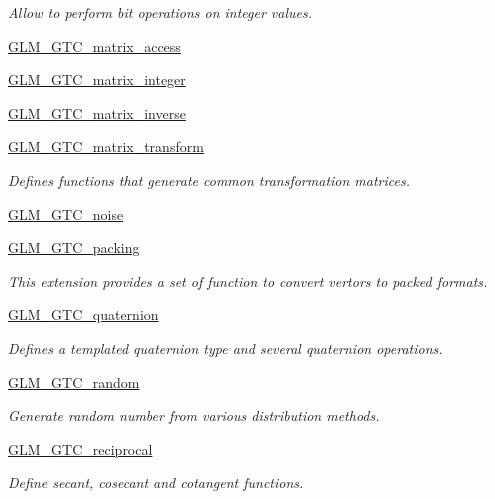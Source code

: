 \begin{DoxyCompactItemize}
\begin{DoxyCompactList}\small\item\em Allow to perform bit operations on integer values. \end{DoxyCompactList}\item 
\hyperlink{group__gtc__matrix__access}{G\+L\+M\+\_\+\+G\+T\+C\+\_\+matrix\+\_\+access}
\item 
\hyperlink{group__gtc__matrix__integer}{G\+L\+M\+\_\+\+G\+T\+C\+\_\+matrix\+\_\+integer}
\item 
\hyperlink{group__gtc__matrix__inverse}{G\+L\+M\+\_\+\+G\+T\+C\+\_\+matrix\+\_\+inverse}
\item 
\hyperlink{group__gtc__matrix__transform}{G\+L\+M\+\_\+\+G\+T\+C\+\_\+matrix\+\_\+transform}
\begin{DoxyCompactList}\small\item\em Defines functions that generate common transformation matrices. \end{DoxyCompactList}\item 
\hyperlink{group__gtc__noise}{G\+L\+M\+\_\+\+G\+T\+C\+\_\+noise}
\item 
\hyperlink{group__gtc__packing}{G\+L\+M\+\_\+\+G\+T\+C\+\_\+packing}
\begin{DoxyCompactList}\small\item\em This extension provides a set of function to convert vertors to packed formats. \end{DoxyCompactList}\item 
\hyperlink{group__gtc__quaternion}{G\+L\+M\+\_\+\+G\+T\+C\+\_\+quaternion}
\begin{DoxyCompactList}\small\item\em Defines a templated quaternion type and several quaternion operations. \end{DoxyCompactList}\item 
\hyperlink{group__gtc__random}{G\+L\+M\+\_\+\+G\+T\+C\+\_\+random}
\begin{DoxyCompactList}\small\item\em Generate random number from various distribution methods. \end{DoxyCompactList}\item 
\hyperlink{group__gtc__reciprocal}{G\+L\+M\+\_\+\+G\+T\+C\+\_\+reciprocal}
\begin{DoxyCompactList}\small\item\em Define secant, cosecant and cotangent functions. \end{DoxyCompactList}\item 

\end{DoxyCompactItemize}
